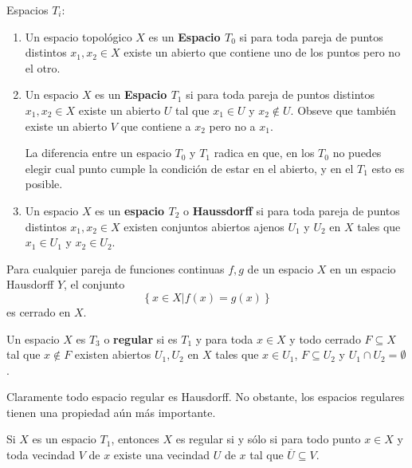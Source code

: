 \documentclass[12pt]{report}
\theoremstyle{largebreak}
\begin{document}
    \begin{mydef}
        Espacios $T_i$:
        \begin{enumerate}
            \item Un espacio topológico $X$ es un \textbf{Espacio $T_0$} si para toda pareja de puntos distintos $x_1,x_2\in X$ existe un abierto que contiene uno de los puntos pero no el otro.
            \item Un espacio $X$ es un \textbf{Espacio $T_1$} si para toda pareja de puntos distintos $x_1,x_2\in X$ existe un abierto $U$ tal que $x_1\in U$ y $x_2\notin U$. Obseve que también existe un abierto $V$ que contiene a $x_2$ pero no a $x_1$.
            
            La diferencia entre un espacio $T_0$ y $T_1$ radica en que, en los $T_0$ no puedes elegir cual punto cumple la condición de estar en el abierto, y en el $T_1$ esto es posible.
            \item Un espacio $X$ es un \textbf{espacio $T_2$} o \textbf{Haussdorff} si para toda pareja de puntos distintos $x_1,x_2\in X$ existen conjuntos abiertos ajenos $U_1$ y $U_2$ en $X$ tales que $x_1\in U_1$ y $x_2\in U_2$.
        \end{enumerate}
    \end{mydef}

    \begin{lema}
        Para cualquier pareja de funciones continuas $f,g$ de un espacio $X$ en un espacio Hausdorff $Y$, el conjunto
        \begin{equation*}
            \left\{x\in X\big|f(x)=g(x) \right\}
        \end{equation*}
        es cerrado en $X$.
    \end{lema}

    \begin{mydef}
        Un espacio $X$ es $T_3$ o \textbf{regular} si es $T_1$ y para toda $x\in X$ y todo cerrado $F\subseteq X$ tal que $x\notin F$ existen abiertos $U_1,U_2$ en $X$ tales que $x\in U_1$, $F\subseteq U_2$ y $U_1\cap U_2=\emptyset$.
    \end{mydef}

    Claramente todo espacio regular es Hausdorff. No obstante, los espacios regulares tienen una propiedad aún más importante.\

    \begin{propo}
        Si $X$ es un espacio $T_1$, entonces $X$ es regular si y sólo si para todo punto $x\in X$ y toda vecindad $V$ de $x$ existe una vecindad $U$ de $x$ tal que $\overline{U}\subseteq V$.
    \end{propo}
\end{document}
